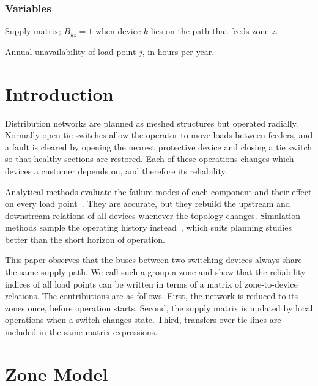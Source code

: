 \documentclass[journal]{IEEEtran}
\begin{document}
\subsubsection*{Variables}
\begin{IEEEdescription}
\item[$\mathbf{B}$] Supply matrix; $B_{kz}=1$ when device $k$ lies on the path that feeds
  zone $z$.
\item[$U_j$] Annual unavailability of load point $j$, in hours per year.
\end{IEEEdescription}

\section{Introduction}
Distribution networks are planned as meshed structures but operated radially. Normally open tie
switches allow the operator to move loads between feeders, and a fault is cleared by opening the
nearest protective device and closing a tie switch so that healthy sections are restored. Each
of these operations changes which devices a customer depends on, and therefore its reliability.

Analytical methods evaluate the failure modes of each component and their effect on every load
point~\cite{billinton1996}. They are accurate, but they rebuild the upstream and downstream
relations of all devices whenever the topology changes. Simulation methods sample the operating
history instead~\cite{allan1991}, which suits planning studies better than the short horizon of
operation.

This paper observes that the buses between two switching devices always share the same supply
path. We call such a group a zone and show that the reliability indices of all load points can
be written in terms of a matrix of zone-to-device relations. The contributions are as follows.
First, the network is reduced to its zones once, before operation starts. Second, the supply
matrix is updated by local operations when a switch changes state. Third, transfers over tie
lines are included in the same matrix expressions.

\section{Zone Model}
\end{document}
